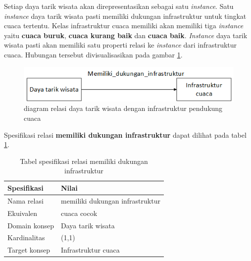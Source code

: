 Setiap daya tarik wisata akan direpresentasikan sebagai satu \textit{instance}. Satu \textit{instance} daya tarik wisata pasti memiliki
dukungan infrastruktur untuk tingkat cuaca tertentu. Kelas infrastruktur cuaca memiliki akan memiliki tiga \textit{instance} yaitu \textbf{cuaca buruk}, 
\textbf{cuaca kurang baik} dan \textbf{cuaca baik}.
\textit{Instance} daya tarik wisata pasti akan memiliki satu properti relasi ke \textit{instance} dari infrastruktur cuaca. Hubungan tersebut
divisualisasikan pada gambar \ref{fig:reldiagram}.
 
\begin{figure}[h!]
    \centering
    \includegraphics[scale=0.7]{img/rel-diagram.png}
    \caption{diagram relasi daya tarik wisata dengan infrastruktur pendukung cuaca}
    \label{fig:reldiagram}
\end{figure}

Spesifikasi relasi \textbf{memiliki dukungan infrastruktur} dapat dilihat pada tabel \ref{table:hasinssupport}.
\begin{table}[h]
\begin{center}
\begin{tabular}{ |l|m{8cm}| } 
\hline
	\textbf{Spesifikasi} & \textbf{Nilai}\\
	\hline
	Nama relasi & memiliki dukungan infrastruktur\\
	\hline
	Ekuivalen & cuaca cocok\\
	\hline
	Domain konsep & Daya tarik wisata\\
	\hline
	Kardinalitas & (1,1)\\
	\hline
	Target konsep & Infrastruktur cuaca\\
	\hline
\end{tabular}
\end{center}
\caption{Tabel spesifikasi relasi memiliki dukungan infrastruktur}
\label{table:hasinssupport}
\end{table}

